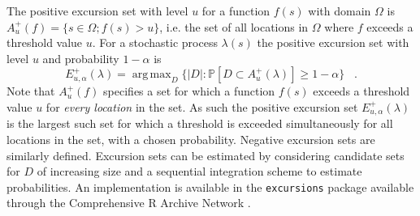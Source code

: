 \documentclass[preprint,12pt]{elsarticle}
\DeclareMathOperator*{\argmax}{arg\,max}  %
\begin{document}
The positive excursion set with level $u$ for a function $f(s)$ with domain $\Omega$ is $A_u^{+}(f) = \{ s \in \Omega ; f(s) > u \}$, i.e. the set of all locations in $\Omega$ where $f$ exceeds a threshold value $u$. For a stochastic process $\lambda(s)$ the positive excursion set with level $u$ and probability $1 - \alpha$ is
\begin{equation*}
E_{u,\alpha}^{+}(\lambda) = \argmax_{D}\{\lvert D \rvert : \mathbb{P}\left[D \subset A_u^{+}(\lambda)\right] \geq 1 - \alpha \} \;\;\; .
\end{equation*}
Note that $A_u^{+}(f)$ specifies a set for which a function $f(s)$ exceeds a threshold value $u$ for \textit{every location} in the set. As such the positive excursion set $E_{u,\alpha}^{+}(\lambda)$ is the largest such set for which a threshold is exceeded simultaneously for all locations in the set, with a chosen probability.  Negative excursion sets are similarly defined.  Excursion sets can be estimated by considering candidate sets for $D$ of increasing size and a sequential integration scheme to estimate probabilities.  An implementation is available in the \texttt{excursions} package \citep{bolin_calculating_2018} available through the Comprehensive R Archive Network \citep{r_2017}.
\end{document}
